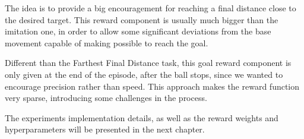The idea is to provide a big encouragement for reaching a final distance close to the desired target. This reward component is usually much bigger than the imitation one, in order to allow some significant deviations from the base movement capable of making possible to reach the goal.

Different than the Farthest Final Distance task, this goal reward component is only given at the end of the episode, after the ball stops, since we wanted to encourage precision rather than speed. This approach makes the reward function very sparse, introducing some challenges in the process.

The experiments implementation details, as well as the reward weights and hyperparameters will be presented in the next chapter.






